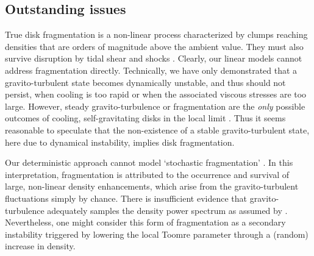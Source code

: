 
\subsection{Outstanding issues}
True disk fragmentation is a non-linear process characterized by
clumps reaching densities that are orders of magnitude above the
ambient value. They must also survive 
disruption by tidal shear and shocks \citep{shlosman87,young16}.  
Clearly, our linear models cannot address fragmentation
directly. Technically, we have only demonstrated that a 
gravito-turbulent state becomes dynamically unstable, and thus should
not persist, when cooling is too rapid or when the associated viscous
stresses are too large.  However, steady gravito-turbulence or 
fragmentation are the \emph{only} possible outcomes of cooling, 
self-gravitating disks in the local limit \citep[][]{gammie01}.    
Thus it seems reasonable to speculate that the non-existence of a stable
gravito-turbulent state, here due to dynamical instability, implies
disk fragmentation.


Our deterministic approach cannot model `stochastic fragmentation'
\citep{paardekooper12,hopkins13}. In this interpretation,  
fragmentation is attributed to the occurrence and survival 
of large, non-linear density enhancements, which arise from the
gravito-turbulent fluctuations simply by chance. %
There is insufficient evidence that gravito-turbulence adequately samples
the density power spectrum as assumed by \cite{hopkins13}.
Nevertheless, one might consider this form of fragmentation as a secondary instability
triggered by lowering the local 
Toomre parameter through a (random) increase in density. 

